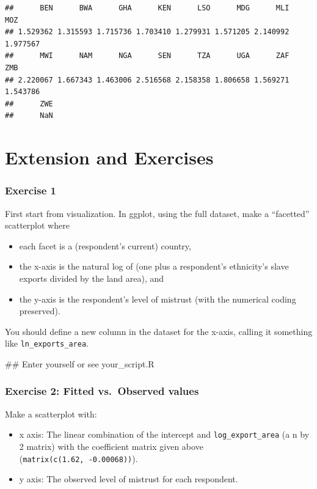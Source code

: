 \documentclass[]{book}
\newenvironment{Shaded}{\begin{snugshade}}{\end{snugshade}}
\newcommand{\NormalTok}[1]{#1}
\providecommand{\tightlist}{%
  \setlength{\itemsep}{0pt}\setlength{\parskip}{0pt}}
\theoremstyle{definition}
\theoremstyle{definition}
\theoremstyle{definition}
\theoremstyle{remark}
\begin{document}
\begin{verbatim}
##      BEN      BWA      GHA      KEN      LSO      MDG      MLI      MOZ 
## 1.529362 1.315593 1.715736 1.703410 1.279931 1.571205 2.140992 1.977567 
##      MWI      NAM      NGA      SEN      TZA      UGA      ZAF      ZMB 
## 2.220067 1.667343 1.463006 2.516568 2.158358 1.806658 1.569271 1.543786 
##      ZWE 
##      NaN
\end{verbatim}

\section{Extension and Exercises}\label{extension-and-exercises}

\subsubsection{Exercise 1}\label{exercise-1}

First start from visualization. In ggplot, using the full dataset, make
a ``facetted'' scatterplot where

\begin{itemize}
\tightlist
\item
  each facet is a (respondent's current) country,
\item
  the x-axis is the natural log of (one plus a respondent's ethnicity's
  slave exports divided by the land area), and
\item
  the y-axis is the respondent's level of mistrust (with the numerical
  coding preserved).
\end{itemize}

You should define a new column in the dataset for the x-axis, calling it
something like \texttt{ln\_exports\_area}.

\begin{Shaded}
\begin{Highlighting}[]
\NormalTok{## Enter yourself or see your_script.R}
\end{Highlighting}
\end{Shaded}

\subsubsection{Exercise 2: Fitted vs.~Observed
values}\label{exercise-2-fitted-vs.observed-values}

Make a scatterplot with:

\begin{itemize}
\tightlist
\item
  x axis: The linear combination of the intercept and
  \texttt{log\_export\_area} (a n by 2 matrix) with the coefficient
  matrix given above (\texttt{matrix(c(1.62,\ -0.00068))}).
\item
  y axis: The observed level of mistrust for each respondent.
\end{itemize}
\end{document}
